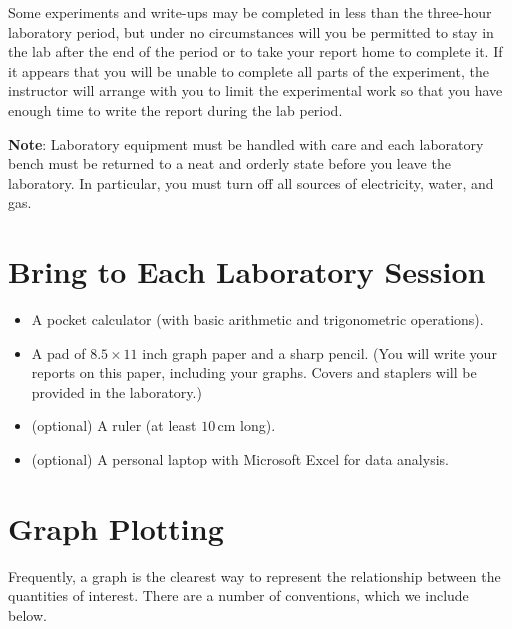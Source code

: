 Some experiments and write-ups may be completed in less than the three-hour laboratory period, but under no circumstances will you be permitted to stay in the lab after the end of the period or to take your report home to complete it.  If it appears that you will be unable to complete all parts of the experiment, the instructor will arrange with you to limit the experimental work so that you have enough time to write the report during the lab period.\myskip

\textbf{Note}: Laboratory equipment must be handled with care and each laboratory bench must be returned to a neat and orderly state before you leave the laboratory.  In particular, you must turn off all sources of electricity, water, and gas.

\section{Bring to Each Laboratory Session}

\begin{itemize}
    \item A pocket calculator (with basic arithmetic and trigonometric operations).

    \item A pad of $8.5 \times 11$ inch graph paper and a sharp pencil.  (You will write your reports on this paper, including your graphs.  Covers and staplers will be provided in the laboratory.)

    \item (optional) A ruler (at least $10\,\mathrm{cm}$ long).
    \item (optional) A personal laptop with Microsoft Excel for data analysis.
\end{itemize}

\section{Graph Plotting}

Frequently, a graph is the clearest way to represent the relationship between the quantities of interest.  There are a number of conventions, which we include below.

